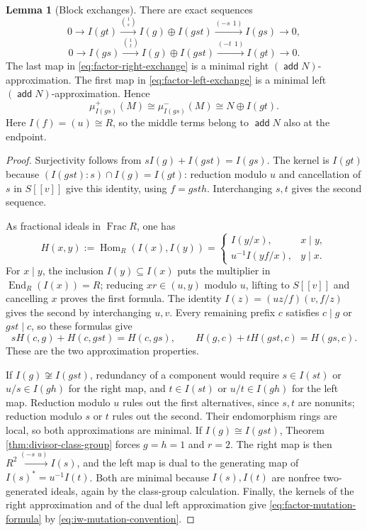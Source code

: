 \documentclass[a4paper,reqno]{amsart}
\DeclareMathOperator{\add}{\mathsf{add}}
\DeclareMathOperator{\Hom}{Hom}
\DeclareMathOperator{\End}{End}
\DeclareMathOperator{\Frac}{Frac}
\theoremstyle{definition}
\newtheorem{Lem}[Thm]{Lemma}
\begin{document}
\begin{Lem}[Block exchanges]\label{lem:factor-exchange-mutation}
There are exact sequences
\begin{equation}\label{eq:factor-right-exchange}
0\longrightarrow I(gt)\xrightarrow{\binom{1}{s}}I(g)\oplus I(gst)
\xrightarrow{(-s\ \ 1)}I(gs)\longrightarrow0,
\end{equation}
\begin{equation}\label{eq:factor-left-exchange}
0\longrightarrow I(gs)\xrightarrow{\binom{1}{t}}I(g)\oplus I(gst)
\xrightarrow{(-t\ \ 1)}I(gt)\longrightarrow0.
\end{equation}
The last map in \eqref{eq:factor-right-exchange} is a minimal right $(\add N)$-approximation. The first map in \eqref{eq:factor-left-exchange} is a minimal left $(\add N)$-approximation. Hence
\begin{equation}\label{eq:factor-mutation-formula}
\mu_{I(gs)}^+(M)\cong\mu_{I(gs)}^-(M)\cong N\oplus I(gt).
\end{equation}
Here $I(f)=(u)\cong R$, so the middle terms belong to $\add N$ also at the endpoint.
\end{Lem}
\begin{proof}
Surjectivity follows from $sI(g)+I(gst)=I(gs)$. The kernel is $I(gt)$ because $(I(gst):s)\cap I(g)=I(gt)$: reduction modulo $u$ and cancellation of $s$ in $S[[v]]$ give this identity, using $f=gsth$. Interchanging $s,t$ gives the second sequence.

As fractional ideals in $\Frac R$, one has
\begin{equation}\label{eq:comparable-ideal-hom}
H(x,y):=\Hom_R(I(x),I(y))=
\begin{cases}
I(y/x),&x\mid y,\\
u^{-1}I(yf/x),&y\mid x.
\end{cases}
\end{equation}
For $x\mid y$, the inclusion $I(y)\subseteq I(x)$ puts the multiplier in $\End_R(I(x))=R$; reducing $xr\in(u,y)$ modulo $u$, lifting to $S[[v]]$ and cancelling $x$ proves the first formula. The identity $I(z)=(uz/f)(v,f/z)$ gives the second by interchanging $u,v$. Every remaining prefix $c$ satisfies $c\mid g$ or $gst\mid c$, so these formulas give
\[
sH(c,g)+H(c,gst)=H(c,gs),\qquad
H(g,c)+tH(gst,c)=H(gs,c).
\]
These are the two approximation properties.

If $I(g)\not\cong I(gst)$, redundancy of a component would require $s\in I(st)$ or $u/s\in I(gh)$ for the right map, and $t\in I(st)$ or $u/t\in I(gh)$ for the left map. Reduction modulo $u$ rules out the first alternatives, since $s,t$ are nonunits; reduction modulo $s$ or $t$ rules out the second. Their endomorphism rings are local, so both approximations are minimal. If $I(g)\cong I(gst)$, Theorem \ref{thm:divisor-class-group} forces $g=h=1$ and $r=2$. The right map is then $R^2\xrightarrow{(-s\ \ u)}I(s)$, and the left map is dual to the generating map of $I(s)^*=u^{-1}I(t)$. Both are minimal because $I(s),I(t)$ are nonfree two-generated ideals, again by the class-group calculation. Finally, the kernels of the right approximation and of the dual left approximation give \eqref{eq:factor-mutation-formula} by \eqref{eq:iw-mutation-convention}.
\end{proof}
\end{document}
